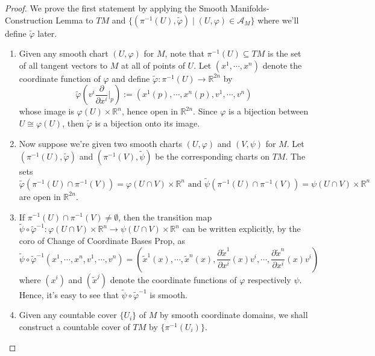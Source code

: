 \begin{proof}
    We prove the first statement by applying the Smooth Manifolds-Construction Lemma to $TM$ and $\{ (\pi^{-1}(U), \widetilde{\varphi}) \mid (U,\varphi) \in \mathcal{A}_M\}$ where we'll define $\widetilde{\varphi}$ later.
    \begin{enumerate}
        \item Given any smooth chart $(U, \varphi)$ for $M$, note that $\pi^{-1} (U) \subseteq TM$ is the set of all tangent vectors to $M$ at all of points of $U$. Let $(x^1 ,\cdots, x^n)$ denote the coordinate function of $\varphi$ and define $\widetilde{\varphi}: \pi^{-1} (U) \to \mathbb{R}^{2n}$ by
        \[
        \widetilde{\varphi}(v^i \frac{\partial}{\partial x^i}|_p) := (x^1 (p) ,\cdots, x^n(p), v^1,\cdots, v^n)
        \]
        whose image is $\varphi(U) \times \mathbb{R}^n$, hence open in $\mathbb{R}^{2n}$. Since $\varphi$ is a bijection between $U\cong \varphi(U)$, then $\widetilde{\varphi}$ is a bijection onto its image.

        \item Now suppose we're given two smooth charts $(U,\varphi)$ and $(V,\psi)$ for $M$. Let $(\pi^{-1}(U), \widetilde{\varphi})$ and $(\pi^{-1}(V), \widetilde{\psi})$ be the corresponding charts on $TM$. The sets
        \[
        \widetilde{\varphi} (\pi^{-1} (U) \cap \pi^{-1} (V))= \varphi(U\cap V) \times \mathbb{R}^n \text{ and } \widetilde{\psi} (\pi^{-1} (U) \cap \pi^{-1} (V))= \psi(U\cap V) \times \mathbb{R}^n
        \]
        are open in $\mathbb{R}^{2n}$.

        \item If $\pi^{-1} (U) \cap \pi^{-1} (V) \neq \emptyset$, then the transition map $\widetilde{\psi} \circ \widetilde{\varphi}^{-1}:  \varphi(U\cap V) \times \mathbb{R}^n \to  \psi(U\cap V) \times \mathbb{R}^n $ can be written explicitly, by the coro of Change of Coordinate Bases Prop, as
        \[
        \widetilde{\psi} \circ \widetilde{\varphi}^{-1} (x^1 ,\cdots, x^n, v^1,\cdots, v^n)= (\widetilde{x}^1 (x),\cdots, \widetilde{x}^n (x), \frac{\partial \widetilde{x}^1}{\partial x^i} (x)v^i ,\cdots, \frac{\partial \widetilde{x}^n}{\partial x^i} (x)v^i)
        \]
        where $(x^i)$ and $(\widetilde{x}^j)$ denote the coordinate functions of $\varphi$ respectively $\psi$. Hence, it's easy to see that $\widetilde{\psi} \circ \widetilde{\varphi}^{-1}$ is smooth.

        \item Given any countable cover $\{ U_i\}$ of $M$ by smooth coordinate domains, we shall construct a countable cover of $TM$ by $\{ \pi^{-1} (U_i)\}$.


\end{enumerate}
\end{proof}
